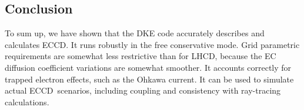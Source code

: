\subsection{Conclusion}

To sum up, we have shown that the DKE code accurately describes and calculates
ECCD. It runs robustly in the free conservative mode. Grid parametric
requirements are somewhat less restrictive than for LHCD, because the EC
diffusion coefficient variations are somewhat smoother. It accounts correctly
for trapped electron effects, such as the Ohkawa current. It can be used to
simulate actual ECCD\ scenarios, including coupling and consistency with
ray-tracing calculations.
